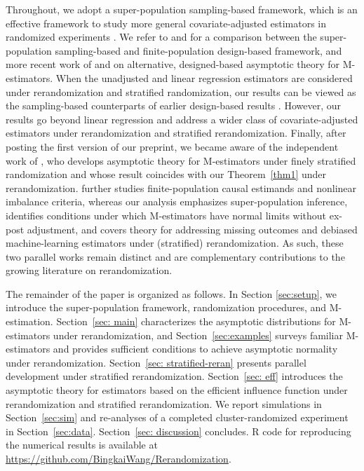 \documentclass[12pt]{article}
\begin{document}
Throughout, we adopt a super-population sampling-based framework, which is an effective framework to study more general covariate-adjusted estimators in randomized experiments \citep{wang2023model}. We refer to \cite{robins2002} and \cite{ding2017bridging} for a comparison between the super-population sampling-based and finite-population design-based framework, and {more recent work of \cite{xu2021potential} and \cite{qu2025randomization} on alternative, designed-based asymptotic theory for M-estimators.} When the unadjusted and linear regression estimators are considered under rerandomization and stratified randomization, our results can be viewed as the sampling-based counterparts of earlier design-based results \citep{li2018asymptotic,li2020rerandomization,lu2023design,wang2023rerandomization}. However, our results go beyond linear regression and address a wider class of covariate-adjusted estimators under rerandomization and stratified rerandomization. {Finally, after posting the first version of our preprint, we became aware of the independent work of \citet{cytrynbaum2024finely}, who develops asymptotic theory for M-estimators under finely stratified randomization \citep{bai2022optimality} and whose result coincides with our Theorem~\ref{thm1} under rerandomization. \citet{cytrynbaum2024finely} further studies finite-population causal estimands and nonlinear imbalance criteria, whereas our analysis emphasizes super-population inference, identifies conditions under which M-estimators have normal limits without ex-post adjustment, and covers theory for addressing missing outcomes and debiased machine-learning estimators under (stratified) rerandomization. As such, these two parallel works remain distinct and are complementary contributions to the growing literature on rerandomization.}

The remainder of the paper is organized as follows. In Section \ref{sec:setup}, we introduce the super-population framework, randomization procedures, and M-estimation. Section~\ref{sec: main} characterizes the asymptotic distributions for M-estimators under rerandomization, and Section~\ref{sec:examples} surveys familiar M-estimators and provides sufficient conditions to achieve asymptotic normality under rerandomization. Section~\ref{sec: stratified-reran} presents parallel development under stratified rerandomization. Section~\ref{sec: eff} introduces the asymptotic theory for estimators based on the efficient influence function under rerandomization and stratified rerandomization. We report simulations in Section~\ref{sec:sim} and re-analyses of a completed cluster-randomized experiment in Section~\ref{sec:data}. Section~\ref{sec: discussion} concludes. R code for reproducing the numerical results is available at \url{https://github.com/BingkaiWang/Rerandomization}. 
\end{document}
